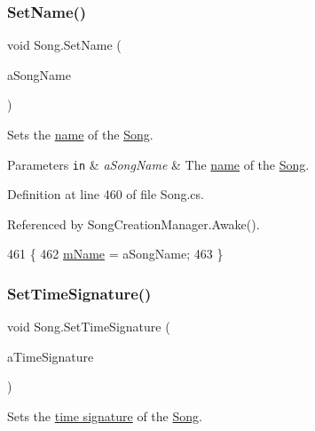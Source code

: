 \subsubsection{\texorpdfstring{Set\+Name()}{SetName()}}
{\footnotesize\ttfamily void Song.\+Set\+Name (\begin{DoxyParamCaption}\item[{string}]{a\+Song\+Name }\end{DoxyParamCaption})}



Sets the \hyperlink{group___song_priv_var_ga6a5e6c1e4aa92939e2b5c1e3d9908df8}{name} of the \hyperlink{class_song}{Song}. 


\begin{DoxyParams}[1]{Parameters}
\mbox{\tt in}  & {\em a\+Song\+Name} & The \hyperlink{group___song_priv_var_ga6a5e6c1e4aa92939e2b5c1e3d9908df8}{name} of the \hyperlink{class_song}{Song}. \\
\hline
\end{DoxyParams}


Definition at line 460 of file Song.\+cs.



Referenced by Song\+Creation\+Manager.\+Awake().


\begin{DoxyCode}
461     \{
462         \hyperlink{group___song_priv_var_ga6a5e6c1e4aa92939e2b5c1e3d9908df8}{mName} = aSongName;
463     \}
\end{DoxyCode}
\mbox{\label{group___song_pub_func_gaf9f2c7e6f4400f6f9854e68e70a49470}} 
\subsubsection{\texorpdfstring{Set\+Time\+Signature()}{SetTimeSignature()}}
{\footnotesize\ttfamily void Song.\+Set\+Time\+Signature (\begin{DoxyParamCaption}\item[{\hyperlink{group___music_structs_struct_music_1_1_time_signature}{Music.\+Time\+Signature}}]{a\+Time\+Signature }\end{DoxyParamCaption})}



Sets the \hyperlink{group___music_structs_struct_music_1_1_time_signature}{time signature} of the \hyperlink{class_song}{Song}. 


